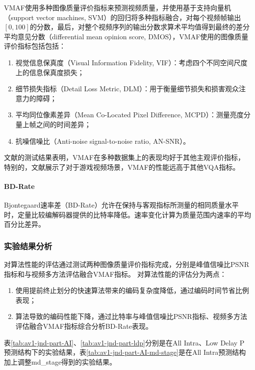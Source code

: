 	VMAF使用多种图像质量评价指标来预测视频质量，并使用基于支持向量机（support vector machines, SVM）的回归将多种指标融合，对每个视频帧输出$[0,100]$的分数，最后，对整个视频序列的输出分数求算术平均值得到最终的差分平均意见分数（differential mean opinion score, DMOS），VMAF使用的图像质量评价指标包括包括：
	\begin{enumerate}[label=\arabic*)]
		\item 视觉信息保真度（Visual Information Fidelity, VIF）：考虑四个不同空间尺度上的信息保真度损失；
		\item 细节损失指标（Detail Loss Metric, DLM）：用于衡量细节损失和损害观众注意力的障碍；
		\item 平均同位像素差异（Mean Co-Located Pixel Difference, MCPD）：测量亮度分量上帧之间的时间差异；
		\item 抗噪信噪比（Anti-noise signal-to-noise ratio, AN-SNR）。
	\end{enumerate}
	
	文献\cite{liPracticalPerceptualVideo,barmanEvaluationVideoQuality2018a, leeComparisonObjectiveQuality2017}的测试结果表明，VMAF在多种数据集上的表现均好于其他主观评价指标，特别的，文献\cite{barmanEvaluationVideoQuality2018a}展示了对于游戏视频场景，VMAF的性能远高于其他VQA指标。
	
	\paragraph{BD-Rate} Bjontegaard速率差（BD-Rate）允许在保持与客观指标所测量的相同质量水平时，定量比较编解码器提供的比特率降低。速率变化计算为质量范围内速率的平均百分比差异。
	
  \subsubsection{实验结果分析}

  对算法性能的评估通过测试两种图像质量评价指标完成，分别是峰值信噪比PSNR指标和与视频多方法评估融合VMAF指标。
  对算法性能的评估分为两点：

  \begin{enumerate}[label=\arabic*)]
    \item 使用提前终止划分的快速算法带来的编码复杂度降低，通过编码时间节省比例表现；
    \item 算法导致的编码性能下降，通过比特率与峰值信噪比PSNR指标、视频多方法评估融合VMAF指标综合分析BD-Rate表现。
  \end{enumerate}

  表\ref{tab:av1-jnd-part-AI}、\ref{tab:av1-jnd-part-ldp}分别是在All Intra、Low Delay P预测结构下的实验结果，表\ref{tab:av1-jnd-part-AI-md-stage}是在All Intra预测结构加上调整md\_stage得到的实验结果。

